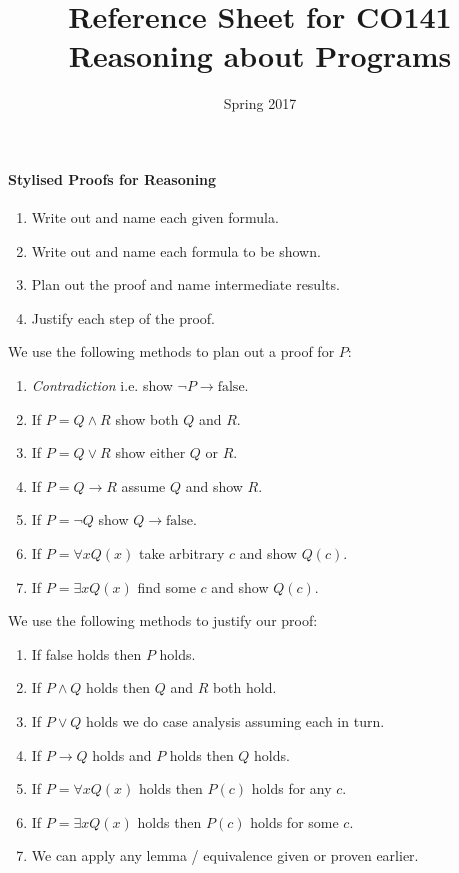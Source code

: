 \documentclass[10pt,twoside,twocolumn]{article}
\begin{document}
\title{Reference Sheet for CO141 Reasoning about Programs}


\date{Spring 2017}

\maketitle

\paragraph{Stylised Proofs for Reasoning}
\begin{enumerate}
\item Write out and name each given formula.
\item Write out and name each formula to be shown.
\item Plan out the proof and name intermediate results.
\item Justify each step of the proof.
\end{enumerate}
We use the following methods to plan out a proof for $P$:
\begin{enumerate}
\item \emph{Contradiction} i.e. show $\lnot P\rightarrow\mbox{false}$.
\item If $P=Q\land R$ show both $Q$ and $R$.
\item If $P=Q\lor R$ show either $Q$ or $R$.
\item If $P=Q\rightarrow R$ assume $Q$ and show $R$.
\item If $P=\lnot Q$ show $Q\rightarrow\mbox{false}$.
\item If $P=\forall xQ\left(x\right)$ take arbitrary $c$ and show $Q\left(c\right)$.
\item If $P=\exists xQ\left(x\right)$ find some $c$ and show $Q\left(c\right)$.
\end{enumerate}
We use the following methods to justify our proof:
\begin{enumerate}
\item If false holds then $P$ holds.
\item If $P\land Q$ holds then $Q$ and $R$ both hold.
\item If $P\lor Q$ holds we do case analysis assuming each in turn.
\item If $P\rightarrow Q$ holds and $P$ holds then $Q$ holds.
\item If $P=\forall xQ\left(x\right)$ holds then $P\left(c\right)$ holds
for any $c$.
\item If $P=\exists xQ\left(x\right)$ holds then $P\left(c\right)$ holds
for some $c$.
\item We can apply any lemma / equivalence given or proven earlier.
\end{enumerate}
\end{document}
